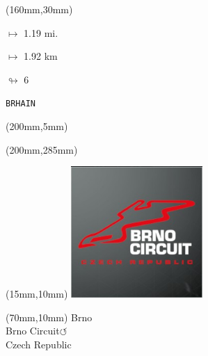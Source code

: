 \begin{textblock*}{40mm}(160mm,30mm)%
\Large
\par$\mapsto$ 1.19 mi.
\par$\mapsto$ 1.92 km
\par$\looparrowright$ 6
\par\hfill\tiny\tt BRHAIN\\
\end{textblock*}
\begin{textblock*}{20mm}(200mm,5mm)%
\fbox{\thepage}
\label{BRHAIN}
\end{textblock*}
\begin{textblock*}{20mm}(200mm,285mm)%
\fbox{\thepage}
\end{textblock*}

\null\newpage
\begin{textblock*}{50mm}(15mm,10mm)%
\includegraphics[width=50mm]{LG/2015-05-20_00075.png}
\end{textblock*}
\begin{textblock*}{130mm}(70mm,10mm)%
{\fontsize{20}{20}\selectfont Brno\\}
{\fontsize{16}{16}\selectfont Brno Circuit\hfill \huge$\circlearrowleft$\\}
{\fontsize{12}{12}\selectfont Czech Republic\\}
\end{textblock*}
